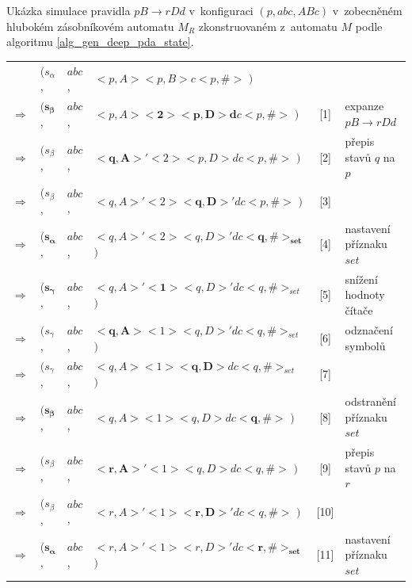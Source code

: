 \begin{Example}
\setlength{\tabcolsep}{\deftabcolsep}

\newpage
Ukázka simulace pravidla $pB \rightarrow r Dd$ v~konfiguraci $(p, abc, ABc)$ v~zobecněném hlubokém zásobníkovém automatu $M_{R}$ zkonstruovaném z~automatu $M$ podle algoritmu \ref{alg_gen_deep_pda_state}.\medskip


\setlength{\deftabcolsep}{\tabcolsep}
\setlength{\tabcolsep}{4pt}

\begin{tabular}{llllc|l}
                & $( s_{\alpha}$,  & $abc$, & $<p,A> <p,B> c <p, \#>$         $)$ & &  \\
$\Rightarrow$   & $( \mathbf{s_{\beta}}$,   & $abc$, & $<p,A> \mathbf{<2> <p,D> d} c <p, \#>$   $)$ & [1] \quad&\quad expanze $pB \rightarrow r Dd$ \\
$\Rightarrow$   & $( s_{\beta}$,   & $abc$, & $\mathbf{<q,A>'} <2> <p,D> d c <p, \#>$         $)$  & [2] \quad&\quad přepis stavů $q$ na $p$\\
$\Rightarrow$   & $( s_{\beta}$,   & $abc$, & $<q,A>' <2> \mathbf{<q,D>'} d c <p, \#>$         $)$  & [3] \quad&\quad \\
$\Rightarrow$   & $( \mathbf{s_{\alpha}}$,   & $abc$, & $<q,A>' <2> <q,D>' d c \mathbf{<q, \#>_{set}}$         $)$  & [4] \quad&\quad nastavení příznaku $set$\\
$\Rightarrow$   & $( \mathbf{s_{\gamma}}$,  & $abc$, & $<q,A>' \mathbf{<1>} <q,D>' d c <q, \#>_{set}$  $)$  & [5] \quad&\quad snížení hodnoty čítače \\
$\Rightarrow$   & $( s_{\gamma}$,  & $abc$, & $\mathbf{<q,A>} <1> <q,D>' d c <q, \#>_{set}$  $)$  & [6] \quad&\quad odznačení symbolů \\
$\Rightarrow$   & $( s_{\gamma}$,  & $abc$, & $<q,A> <1> \mathbf{<q,D>} d c <q, \#>_{set}$  $)$  & [7] \quad&\quad  \\
$\Rightarrow$   & $( \mathbf{s_{\beta}}$,  & $abc$, & $<q,A> <1> <q,D> d c \mathbf{<q, \#>}$  $)$  & [8] \quad&\quad  odstranění příznaku $set$\\
$\Rightarrow$   & $( s_{\beta}$,  & $abc$, & $\mathbf{<r,A>'} <1> <q,D> d c <q, \#>$  $)$  & [9] \quad&\quad  přepis stavů $p$ na $r$\\
$\Rightarrow$   & $( s_{\beta}$,  & $abc$, & $<r,A>' <1> \mathbf{<r,D>'} d c <q, \#>$  $)$  & [10] \quad&\quad  \\
$\Rightarrow$   & $( \mathbf{s_{\alpha}}$,  & $abc$, & $<r,A>' <1> <r,D>' d c \mathbf{<r, \#>_{set}}$  $)$  & [11] \quad&\quad  nastavení příznaku $set$\\

\end{tabular}
\end{Example}
